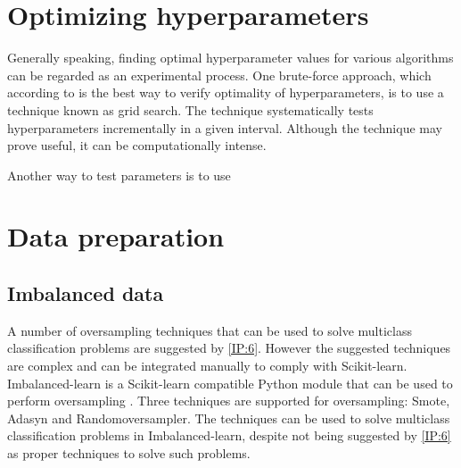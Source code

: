\section{Optimizing hyperparameters} \label{sec:hyperparameters}
	Generally speaking, finding optimal hyperparameter values for various algorithms can be regarded as an experimental process. One brute-force approach, which according to \cite{BOOK:9} is the best way to verify optimality of hyperparameters, is to use a technique known as grid search. The technique systematically tests hyperparameters incrementally in a given interval. Although the technique may prove useful, it can be computationally intense.

	Another way to test parameters is to use

	







	
\section{Data preparation}
	
	\subsection{Imbalanced data} \label{sec:imbalancedtheory}
	A number of oversampling techniques that can be used to solve multiclass classification problems are suggested by \ref{IP:6}. However the suggested techniques are complex and can be integrated manually to comply with Scikit-learn. Imbalanced-learn is a Scikit-learn compatible Python module that can be used to perform oversampling \cite{WEBSITE:22}. Three techniques are supported for oversampling: Smote, Adasyn and Randomoversampler. The techniques can be used to solve multiclass classification problems in Imbalanced-learn, despite not being suggested by \ref{IP:6} as proper techniques to solve such problems. 

